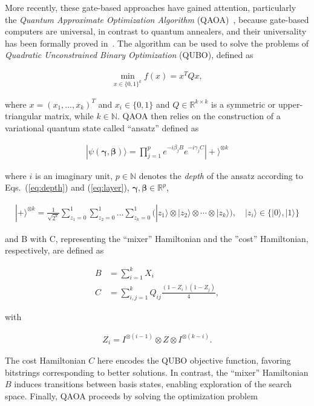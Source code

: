 More recently, these gate-based approaches have gained attention, particularly the \textit{Quantum Approximate Optimization Algorithm} (QAOA)~\citep{farhi2014qaoa}, because gate-based computers are universal, in contrast to quantum annealers, and their universality has been formally proved in~\citep{universalityQC}. The algorithm can be used to solve the problems of \textit{Quadratic Unconstrained Binary Optimization} (QUBO), defined as

\begin{align}
    \min_{x\in \{0, 1\}^k} f(x) = x^TQx,\label{eq:qubo}
\end{align}

where $x = (x_1, \ldots, x_k)^T$ and $x_i\in\{0, 1\}$ and $Q \in \mathbb{R}^{k \times k}$ is a symmetric or upper-triangular matrix, while $k \in \mathbb{N}$. QAOA then relies on the construction of a variational quantum state called ``ansatz'' defined as

\begin{align}
    |\psi(\mathbf{\gamma}, \mathbf{\beta})\rangle = \prod_{j=1}^{p} e^{-i\beta_j B} e^{-i \gamma_j C} |+\rangle^{\otimes k}
\end{align}

where $i$ is an imaginary unit, $p \in \mathbb{N}$ denotes the \textit{depth} of the ansatz according to Eqs.~(\ref{eq:depth}) and (\ref{eq:layer}), $\mathbf{\gamma}, \mathbf{\beta} \in \mathbb{R}^p$,

\begin{align}
|+\rangle^{\otimes k} = \frac{1}{\sqrt{2^k}} \sum_{z_1 = 0}^1\sum_{z_2 = 0}^1\ldots \sum_{z_k = 0}^1 (|z_1\rangle \otimes |z_2\rangle \otimes \cdots \otimes |z_k\rangle), \quad |z_i\rangle \in \{ |0\rangle, |1\rangle\}
\end{align}

and B with C, representing the ``mixer'' Hamiltonian and the ''cost'' Hamiltonian, respectively, are defined as 

\begin{align}
    B &= \sum^k_{i=1} X_i\\
    C &= \sum^k_{i,j = 1} Q_{ij}\frac{(1-Z_i)(1-Z_j)}{4}, 
\end{align}

with 

\begin{align}
    Z_i = I^{\otimes(i-1)} \otimes Z \otimes I^{\otimes(k-i)}.
\end{align}

The cost Hamiltonian $C$ here encodes the QUBO objective function, favoring bitstrings corresponding to better solutions. In contrast, the ``mixer'' Hamiltonian $B$ induces transitions between basis states, enabling exploration of the search space.
Finally, QAOA proceeds by solving the optimization problem

